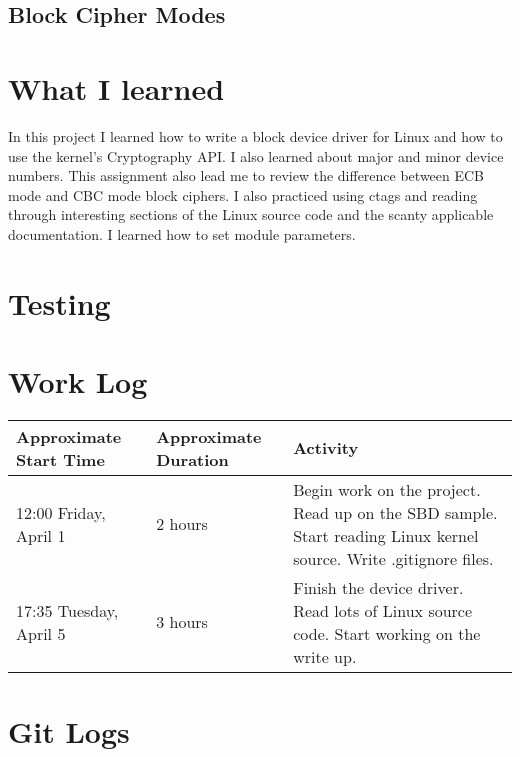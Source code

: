\documentclass[10pt,conference,draftclsnofoot,onecolumn]{IEEEtran}
\begin{document}
\subsection{Block Cipher Modes}
\section{What I learned}
In this project I learned how to write a block device driver for Linux and how to use the kernel's Cryptography API. I also learned about major and minor device numbers. This assignment also lead me to review the difference between ECB mode and CBC mode block ciphers. I also practiced using ctags and reading through interesting sections of the Linux source code and the scanty applicable documentation. I learned how to set module parameters.

\section{Testing}

\section{Work Log}
\begin{tabular}{|p{5cm}|p{5cm}|p{5cm}}
    \textbf{Approximate Start Time} & \textbf{Approximate Duration} & \textbf{Activity} \\
    \hline
    12:00 Friday, April 1 & 2 hours & Begin work on the project. Read up on the SBD sample. Start reading Linux kernel source. Write .gitignore files. \\
    17:35 Tuesday, April 5 & 3 hours & Finish the device driver. Read lots of Linux source code. Start working on the write up. \\
\end{tabular}

\bigskip
\bigskip

\section{Git Logs}

\clearpage
\printbibliography
\end{document}
